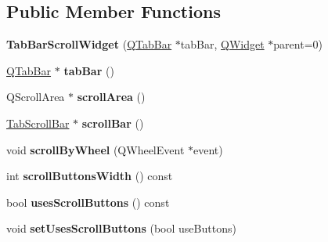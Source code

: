 \subsection*{Public Member Functions}
\begin{DoxyCompactItemize}
\item 
\hypertarget{class_tab_bar_scroll_widget_ac9f5578f01099a3f0b07ffebf79be736}{
{\bfseries TabBarScrollWidget} (\hyperlink{class_q_tab_bar}{QTabBar} $\ast$tabBar, \hyperlink{class_q_widget}{QWidget} $\ast$parent=0)}
\label{class_tab_bar_scroll_widget_ac9f5578f01099a3f0b07ffebf79be736}

\item 
\hypertarget{class_tab_bar_scroll_widget_a8cdb56dbc58327427e8283d563558ab2}{
\hyperlink{class_q_tab_bar}{QTabBar} $\ast$ {\bfseries tabBar} ()}
\label{class_tab_bar_scroll_widget_a8cdb56dbc58327427e8283d563558ab2}

\item 
\hypertarget{class_tab_bar_scroll_widget_af3bb9c0713ded8308611e198f834fda1}{
QScrollArea $\ast$ {\bfseries scrollArea} ()}
\label{class_tab_bar_scroll_widget_af3bb9c0713ded8308611e198f834fda1}

\item 
\hypertarget{class_tab_bar_scroll_widget_a850f2ea062974be7be1f6b58761a8a79}{
\hyperlink{class_tab_scroll_bar}{TabScrollBar} $\ast$ {\bfseries scrollBar} ()}
\label{class_tab_bar_scroll_widget_a850f2ea062974be7be1f6b58761a8a79}

\item 
\hypertarget{class_tab_bar_scroll_widget_a9d361a6291b10a23c1545a8101e562c3}{
void {\bfseries scrollByWheel} (QWheelEvent $\ast$event)}
\label{class_tab_bar_scroll_widget_a9d361a6291b10a23c1545a8101e562c3}

\item 
\hypertarget{class_tab_bar_scroll_widget_ad5154497fc810c2129bcdce8bd0f4725}{
int {\bfseries scrollButtonsWidth} () const }
\label{class_tab_bar_scroll_widget_ad5154497fc810c2129bcdce8bd0f4725}

\item 
\hypertarget{class_tab_bar_scroll_widget_af7bf35a9970590eef45fafb19cb3931f}{
bool {\bfseries usesScrollButtons} () const }
\label{class_tab_bar_scroll_widget_af7bf35a9970590eef45fafb19cb3931f}

\item 
\hypertarget{class_tab_bar_scroll_widget_a0a95792b2d0aad18ac5929afc5197414}{
void {\bfseries setUsesScrollButtons} (bool useButtons)}
\label{class_tab_bar_scroll_widget_a0a95792b2d0aad18ac5929afc5197414}


\end{DoxyCompactItemize}
